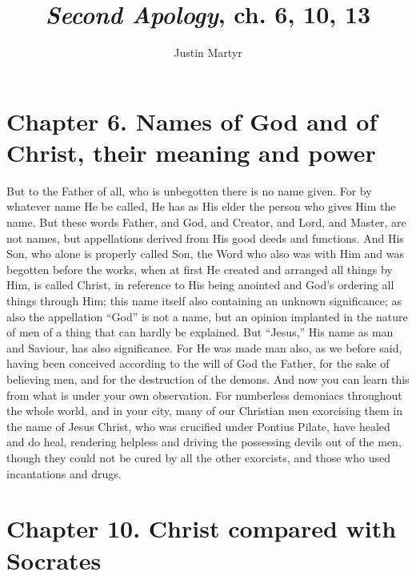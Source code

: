 \documentclass[9pt, twocolumn, oneside, a4paper]{memoir}
\title{\textit{Second Apology}, ch. 6, 10, 13}
\author{ Justin Martyr}
\date{}
\begin{document}
\maketitle
\section*{Chapter 6. Names of God and of Christ, their meaning and power}


But to the Father of all, who is unbegotten there is no name given. For by whatever name He be called, He has as His elder the person who gives Him the name. But these words Father, and God, and Creator, and Lord, and Master, are not names, but appellations derived from His good deeds and functions. And His Son, who alone is properly called Son, the Word who also was with Him and was begotten before the works, when at first He created and arranged all things by Him, is called Christ, in reference to His being anointed and God's ordering all things through Him; this name itself also containing an unknown significance; as also the appellation ``God'' is not a name, but an opinion implanted in the nature of men of a thing that can hardly be explained. But ``Jesus,'' His name as man and Saviour, has also significance. For He was made man also, as we before said, having been conceived according to the will of God the Father, for the sake of believing men, and for the destruction of the demons. And now you can learn this from what is under your own observation. For numberless demoniacs throughout the whole world, and in your city, many of our Christian men exorcising them in the name of Jesus Christ, who was crucified under Pontius Pilate, have healed and do heal, rendering helpless and driving the possessing devils out of the men, though they could not be cured by all the other exorcists, and those who used incantations and drugs.
\section*{Chapter 10. Christ compared with Socrates}
\end{document}
